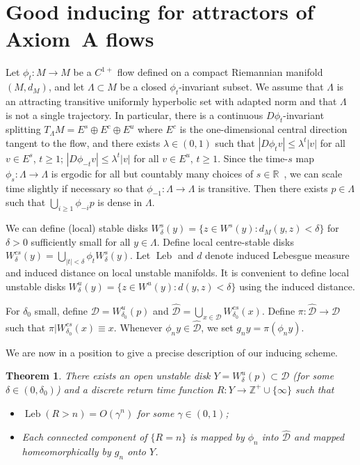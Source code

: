\documentclass[12pt]{article}
\numberwithin{equation}{section}
\newtheorem{thm}{Theorem}[section]
\newcommand{\R}{{\mathbb R}}
\newcommand{\Z}{{\mathbb Z}}
\newcommand{\cD}{{\mathcal D}}
\newcommand{\hcD}{{\widehat {\mathcal D}}}
\newcommand{\Leb}{\operatorname{Leb}}
\begin{document}
\section{Good inducing for attractors of Axiom~A flows}
\label{sec:induce}

Let $\phi_t: M\to  M$ be a $C^{1+}$ flow
defined on a compact Riemannian manifold $(M,d_M)$,
 and let 
$\Lambda\subset M$ be a closed $\phi_t$-invariant subset.
We assume that $\Lambda$ is an attracting transitive uniformly hyperbolic set with adapted norm and that $\Lambda$ is not a single trajectory.
In particular, there is a continuous $D\phi_t$-invariant splitting $T_\Lambda M=E^s\oplus E^c\oplus  E^u$ where $E^c$ is the one-dimensional central direction tangent to the flow, and
there exists $\lambda\in(0,1)$ such that
$|D\phi_t v|\le\lambda^t|v|$ for all $v\in E^s$, $t\ge 1$;
$|D\phi_{-t} v|\le\lambda^t|v|$ for all $v\in E^u$, $t\ge 1$. 
Since the time-$s$ map $\phi_s:\Lambda\to\Lambda$ is ergodic for all but countably many choices of $s\in\R$~\cite{PughShub71},
we can scale time slightly if necessary so that $\phi_{-1}:\Lambda\to\Lambda$ is transitive.
Then there exists $p\in \Lambda$ such that $\bigcup_{i\ge1}\phi_{-i}p$ is dense in $\Lambda$.

We can define (local) stable disks $W^s_\delta(y)=\{z\in W^s(y):d_M(y,z)<\delta\}$ for $\delta>0$ sufficiently small for all $y\in \Lambda$.
Define 
local centre-stable disks $W^{cs}_\delta(y)=\bigcup_{|t|<\delta}\phi_t W^s_\delta(y)$.
Let $\Leb$ and $d$ denote induced Lebesgue measure and induced distance on local unstable manifolds.
It is convenient to define local unstable disks 
$W^u_\delta(y)=\{z\in W^u(y):d(y,z)<\delta\}$ using the induced distance.

For $\delta_0$ small, define $\cD=W^u_{\delta_0}(p)$
and $\hcD=\bigcup_{x\in \cD}W^{cs}_{\delta_0}(x)$.
Define $\pi:\hcD\to\cD$ such that $\pi| W^{cs}_{\delta_0}(x)\equiv x$.
Whenever $\phi_ny\in \hcD$, we set $g_ny=\pi(\phi_ny)$.

We are now in a position to give a precise description of our inducing scheme.

\begin{thm} \label{thm:induce}
There exists an open unstable disk $Y=W^u_\delta(p)\subset \cD$ (for some $\delta\in (0,\delta_0)$) and a discrete return time function $R:Y\to \Z^+\cup\{\infty\}$ such that 
\begin{itemize}
\item[(i)] $\Leb(R>n)=O(\gamma^n)$ for some $\gamma\in(0,1)$;
\item[(ii)]  Each connected component of $\{R=n\}$ is mapped by $\phi_n$ into $\hcD$ and
mapped homeomorphically by $g_n$ onto $Y$.
\end{itemize}
\end{thm}
\end{document}
